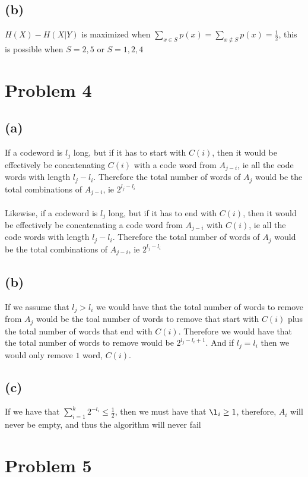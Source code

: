 \subsection*{(b)}
$H(X)-H(X|Y)$ is maximized when 
$\sum_{x\in S}p(x)=\sum_{x\notin S}p(x)=\frac{1}{2}$, this is possible
when $S=\boxed{2,5}$ or $S=\boxed{1,2,4}$
\section*{Problem 4}
\subsection*{(a)}
If a codeword is $l_j$ long, but if it has to start with $C(i)$, then it would be effectively be
concatenating $C(i)$ with a code word from $A_{j-i}$, ie all the code words with length $l_j-l_i$. Therefore the total number of words 
of $A_j$ would be the total combinations of $A_{j-i}$, ie $2^{l_j-l_i}$\\\\
Likewise, if a codeword is $l_j$ long, but if it has to end with $C(i)$, then it would be effectively be
concatenating a code word from $A_{j-i}$ with $C(i)$, ie all the code words with length $l_j-l_i$. Therefore the total number of words 
of $A_j$ would be the total combinations of $A_{j-i}$, ie $2^{l_j-l_i}$
\subsection*{(b)}
If we assume that $l_j>l_i$ we would have that the total number of words to remove from $A_j$ would
be the toal number of words to remove that start with $C(i)$ plus the total number of words that end with
$C(i)$. Therefore we would have that the total number of words to remove would be $2^{l_j-l_i+1}$. 
And if $l_j=l_i$ then we would only remove $1$ word, $C(i)$.
\subsection*{(c)}
If we have that $\sum_{i=1}^{k}2^{-l_i}\leq\frac{1}{2}$, then we must have that $\l_i\geq1$, therefore,
$A_i$ will never be empty, and thus the algorithm will never fail
\section*{Problem 5}
